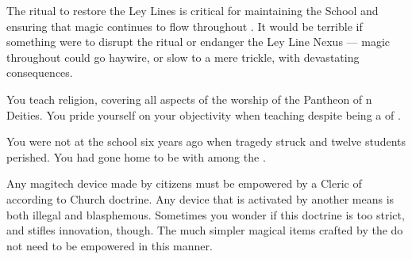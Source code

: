 \documentclass[char]{GL2020}
\begin{document}
\begin{itemz}[Notes]
    \item The ritual to restore the Ley Lines is critical for maintaining the School and ensuring that magic continues to flow throughout \pEarth{}. It would be terrible if something were to disrupt the ritual or endanger the Ley Line Nexus — magic throughout \pEarth{} could go haywire, or slow to a mere trickle, with devastating consequences. 
    \item You teach religion, covering all aspects of the worship of the Pantheon of \pEarth{}n Deities. You pride yourself on your objectivity when teaching despite being a \cBeetle{\cleric} of \cTechGod{}.
    \item You were not at the school six years ago when tragedy struck and twelve students perished. You had gone home to be with \cJuniorStatesman{} among the \pShip{}.
    \item Any magitech device made by \pTech{} citizens must be empowered by a Cleric of \cTechGod{} according to Church doctrine. Any device that is activated by another means is both illegal and blasphemous. Sometimes you wonder if this doctrine is too strict, and stifles innovation, though. The much simpler magical items crafted by the \pShippies{} do not need to be empowered in this manner.
\end{itemz}
\end{document}
